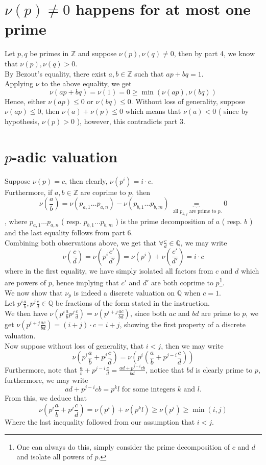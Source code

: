 \documentclass[11pt, a4paper]{article}
\begin{document}
\section{$\nu( p) \neq 0$ happens for at most one prime}
Let $p,q$ be primes in $\mathbb{Z}$ and suppose $\nu( p) ,\nu( q) \neq 0$, then by part 4, we know that $\nu( p),\nu( q) >0 $.\\
By Bezout's equality, there exist $a,b \in \mathbb{Z}$ such that $ a p + bq =1$.\\
Applying $\nu$ to the above equality, we get
\[ 
\nu( ap + bq)  = \nu( 1) = 0 \geq \min ( \nu( ap) , \nu( bq) ) 
\]
Hence, either $ \nu( ap) \leq 0$ or $\nu( bq) \leq 0$. Without loss of generality, suppose $ \nu( ap) \leq 0$, then $\nu( a) +\nu( p) \leq 0$ which means that $\nu( a) <0$ ( since by hypothesis, $\nu( p) >0$ ), however, this contradicts part 3.
\section{$p$-adic valuation}
Suppose $\nu( p) = c$, then clearly, $\nu( p^{i}) = i\cdot c$.\\
Furthermore, if $a,b\in \mathbb{Z}$ are coprime to $p$, then
\[
\nu( \frac{a}{b}) = \nu( p_{a,1} \ldots p_{a,n} 	) - \nu( p_{b,1} \ldots p_{b,m} ) \underbrace{=}_{ \text{ all } p_{k,j} \text{ are prime to  } p.}0 
\]
, where $p_{a,1}\ldots p_{a,n}  $ ( resp. $ p_{b,1} \ldots p_{b,m} $  ) is the prime decomposition of $a$ ( resp. $b$ ) and the last equality follows from part 6.\\
Combining both observations above, we get that $ \forall \frac{c}{d}\in \mathbb{Q}$, we may write
\[ 
\nu( \frac{c}{d}) = \nu( p^{i} \frac{c'}{d'}) =\nu(p^{i}) + \nu( \frac{c'}{d'}) = i\cdot c
\]
where in the first equality, we have simply isolated all factors from $c$ and $d$ which are powers of $p$, hence implying that $c'$ and $d'$ are both coprime to $p$\footnote{One can always do this, simply consider the prime decomposition of $c$ and $d$ and isolate all powers of $p$.}.\\
We now show that $\nu_p$ is indeed a discrete valuation on $ \mathbb{Q}$ when $c=1$.\\
Let $ p^{i} \frac{a}{b}, p^{j} \frac{c}{d}\in \mathbb{Q}$ be fractions of the form stated in the instruction.\\
We then have $\nu\left( p^{i} \frac{a}{b} p^{j} \frac{c}{d}	\right) = \nu( p^{i+j} \frac{ac}{bd})  $, since both $ac$ and $bd$ are prime to $p$, we get $\nu\left( p^{i+j} \frac{ac}{bd}\right) = ( i+j )\cdot c = i+j$, showing the first property of a discrete valuation.\\
Now suppose without loss of generality, that $ i<j$, then we may write 
\[ 
\nu( p^{i}\frac{a}{b}+ p^{j}\frac{c}{d}) = \nu\left( p^{i}\left( \frac{a}{b}+ p^{j-i} \frac{c}{d}\right) \right) 
\]
Furthermore, note that $ \frac{a}{b}+ p^{j-i}\frac{c}{d}= \frac{ad+ p^{j-i}cb}{bd}$, notice that $bd$ is clearly prime to $p$, furthermore, we may write
\[ 
ad+ p^{j-i}cb = p^{k} l \text{ for some integers  } k \text{ and } l.
\]
From this, we deduce that 
\[ 
\nu( p^{i} \frac{a}{b}+ p^{j} \frac{c}{d}) = \nu( p^{i}) + \nu( p^{k}l) \geq \nu( p^{i}) \geq  \min ( i,j) 	
\]
Where the last inequality followed from our assumption that $i < j$.
\end{document}
